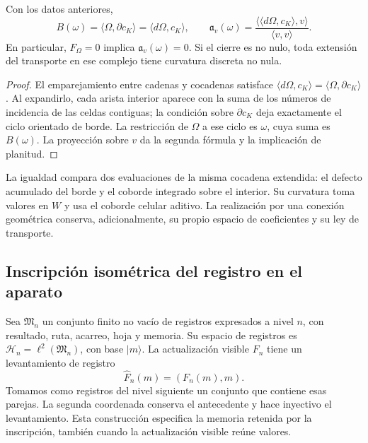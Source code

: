 \begin{theorem}
\label{vii:thm:observador-stokes}
Con los datos anteriores,
\begin{equation}
 B(\omega)=\langle\Omega,\partial c_K\rangle
          =\langle d\Omega,c_K\rangle,
 \qquad
 \mathfrak a_v(\omega)
 =\frac{\langle\langle d\Omega,c_K\rangle,v\rangle}
        {\langle v,v\rangle}.
 \label{vii:eq:observador-stokes}
\end{equation}
En particular, \(F_\Omega=0\) implica \(\mathfrak a_v(\omega)=0\).
Si el cierre es no nulo, toda extensión del transporte en ese complejo
tiene curvatura discreta no nula.
\end{theorem}

\begin{proof}
El emparejamiento entre cadenas y cocadenas satisface
\(\langle d\Omega,c_K\rangle=\langle\Omega,\partial c_K\rangle\).
Al expandirlo, cada arista interior aparece con la suma de los números
de incidencia de las celdas contiguas; la condición sobre
\(\partial c_K\) deja exactamente el ciclo orientado de borde.
La restricción de \(\Omega\) a ese ciclo es \(\omega\), cuya suma
es \(B(\omega)\). La proyección sobre \(v\) da la segunda fórmula
y la implicación de planitud.
\end{proof}

La igualdad compara dos evaluaciones de la misma cocadena extendida:
el defecto acumulado del borde y el coborde integrado sobre el interior.
Su curvatura toma valores en \(W\) y usa el coborde celular aditivo.
La realización por una conexión geométrica conserva, adicionalmente,
su propio espacio de coeficientes y su ley de transporte.

\subsection{Inscripción isométrica del registro en el aparato}
\label{vii:sec:observador-aparato}

Sea \(\mathfrak M_n\) un conjunto finito no vacío de registros
expresados a nivel \(n\), con resultado, ruta, acarreo, hoja y memoria.
Su espacio de registros es
\(\mathcal H_n=\ell^2(\mathfrak M_n)\), con base \(|m\rangle\).
La actualización visible \(F_n\) tiene un levantamiento de registro
\[
 \widehat F_n(m)=(F_n(m),m).
\]
Tomamos como registros del nivel siguiente un conjunto que contiene esas
parejas. La segunda coordenada conserva el antecedente y hace inyectivo
el levantamiento. Esta construcción especifica la memoria retenida por
la inscripción, también cuando la actualización visible reúne valores.

